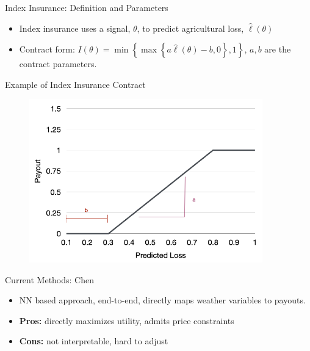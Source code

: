 \documentclass{beamer}
\begin{document}
\begin{frame}{Index Insurance: Definition and Parameters}
\begin{itemize}
    \setlength\itemsep{1em}
    \item Index insurance uses a signal, $\theta$, to predict agricultural loss, $\hat{\ell}(\theta)$
    \item Contract form: $I(\theta) = \min \left \{ \max \left \{a\hat{\ell}(\theta) - b,0 \right \}, 1 \right \}$, $a,b$ are the contract parameters.
\end{itemize}
\end{frame}

\begin{frame}{Example of Index Insurance Contract}
    \begin{figure}
        \includegraphics[width=0.9\textwidth]{../../../output/figures/Presentation/sample_insurance_contract.png}
    \end{figure}
\end{frame}

\begin{frame}{Current Methods: Chen}
    \begin{itemize}
        \setlength\itemsep{1em}
        \item NN based approach, end-to-end, directly maps weather variables to payouts. 
        \item \textbf{Pros:} directly maximizes utility, admits price constraints
        \item \textbf{Cons:} not interpretable, hard to adjust
    \end{itemize}
    \end{frame}
\end{document}
